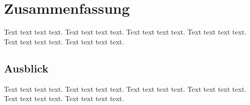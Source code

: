 \documentclass[runningheads,a4paper]{llncs}
\begin{document}
\section{Zusammenfassung}
\label{Zusammenfassung}
Text text text text. Text text text text. Text text text text. Text text text text. Text text text text. Text text text text. 

\subsection{Ausblick}
Text text text text. Text text text text. Text text text text. Text text text text. Text text text text. Text text text text. 



 
\end{document}
